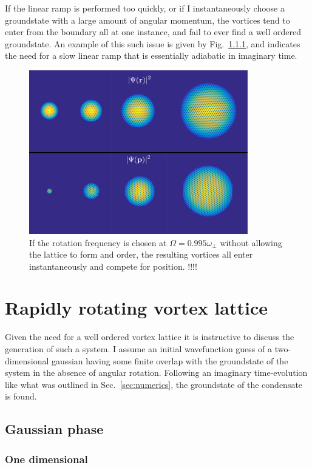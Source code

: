 {If the linear ramp is performed too quickly, or if I instantaneously choose a groundstate with a large amount of angular momentum, the vortices tend to enter from the boundary all at one instance, and fail to ever find a well ordered groundstate. An example of this such issue is given by Fig.~\ref{}, and indicates the need for a slow linear ramp that is essentially adiabatic in imaginary time.

\begin{figure}
    \includegraphics[width=0.85\textwidth]{Images/ch4_vtx/ramp_omega.pdf}
    \caption{If the rotation frequency is chosen at $\Omega=0.995\omega_\perp$ without allowing the lattice to form and order, the resulting vortices all enter instantaneously and compete for position. !!!!}
    \label{fig:malformed_lattice}
\end{figure}

\section{Rapidly rotating vortex lattice}
Given the need for a well ordered vortex lattice it is instructive to discuss the generation of such a system. I assume an initial wavefunction guess of a two-dimensional gaussian having some finite overlap with the groundstate of the system in the absence of angular rotation. Following an imaginary time-evolution like what was outlined in Sec.~\ref{sec:numerics}, the groundstate of the condensate is found.


\subsection{Gaussian phase}

\subsubsection{One dimensional}

}
